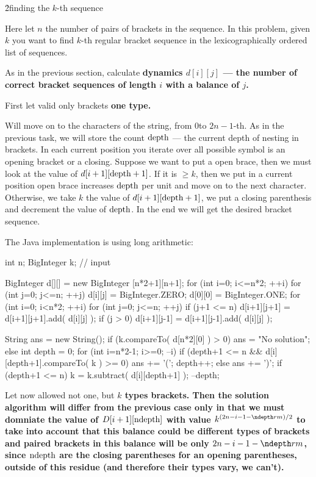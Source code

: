 \h2{finding the $k$-th sequence}

Here let $n$ the number of pairs of brackets in the sequence. In this problem, given $k$ you want to find $k$-th regular bracket sequence in the lexicographically ordered list of sequences.

As in the previous section, calculate \bf{dynamics} $d[i][j]$ --- the number of correct bracket sequences of length $i$ with a balance of $j$.

First let valid only brackets \bf{one} type.

Will move on to the characters of the string, from $0$to $2n-1$-th. As in the previous task, we will store the count $\rm depth$ --- the current depth of nesting in brackets. In each current position you iterate over all possible symbol is an opening bracket or a closing. Suppose we want to put a open brace, then we must look at the value of $d[i+1][\rm depth+1]$. If it is $\ge k$, then we put in a current position open brace increases $\rm depth$ per unit and move on to the next character. Otherwise, we take $k$ the value of $d[i+1][\rm depth+1]$, we put a closing parenthesis and decrement the value of $\rm depth$. In the end we will get the desired bracket sequence.

The Java implementation is using long arithmetic:

\code
int n; BigInteger k; // input

BigInteger d[][] = new BigInteger [n*2+1][n+1];
for (int i=0; i<=n*2; ++i)
for (int j=0; j<=n; ++j)
d[i][j] = BigInteger.ZERO;
d[0][0] = BigInteger.ONE;
for (int i=0; i<n*2; ++i)
for (int j=0; j<=n; ++j) {
if (j+1 <= n)
d[i+1][j+1] = d[i+1][j+1].add( d[i][j] );
if (j > 0)
d[i+1][j-1] = d[i+1][j-1].add( d[i][j] );
}

String ans = new String();
if (k.compareTo( d[n*2][0] ) > 0)
ans = "No solution";
else {
int depth = 0;
for (int i=n*2-1; i>=0; --i)
if (depth+1 <= n && d[i][depth+1].compareTo( k ) >= 0) {
ans += '(';
depth++;
}
else {
ans += ')';
if (depth+1 <= n)
k = k.subtract( d[i][depth+1] );
--depth;
}
}
\endcode

Let now allowed not one, but \bf{$k$ types} brackets. Then the solution algorithm will differ from the previous case only in that we must domniate the value of $D[i+1][\rm ndepth]$ with value $k^{(2n-i-1- \ndepth rm)/2}$ to take into account that this balance could be different types of brackets and paired brackets in this balance will be only $2n-i-1- \ndepth rm$, since $\rm ndepth$ are the closing parentheses for an opening parentheses, outside of this residue (and therefore their types vary, we can't).


